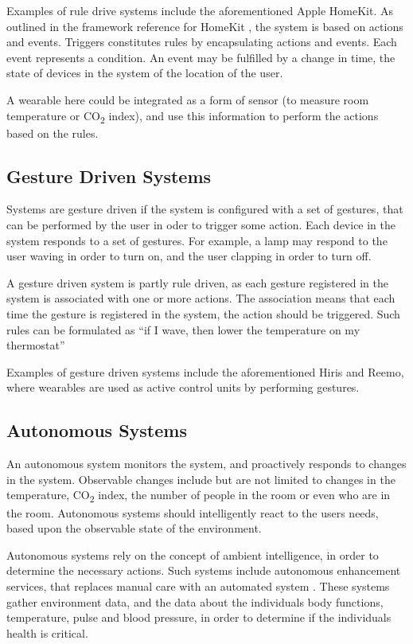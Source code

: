 Examples of rule drive systems include the aforementioned Apple HomeKit. 
As outlined in the framework reference for HomeKit \cite{applehomekitref}, 
the system is based on actions and events. 
Triggers constitutes rules by encapsulating actions and events. 
Each event represents a condition. 
An event may be fulfilled by a change in time, 
the state of devices in the system of the location of the user.

A wearable here could be integrated as a form of sensor (to \eg measure room temperature or CO\textsubscript{2} index), 
and use this information to perform the actions based on the rules.  

\subsection{Gesture Driven Systems}

Systems are gesture driven if the system is configured with a set of gestures, 
that can be performed by the user in oder to trigger some action. 
Each device in the system responds to a set of gestures. 
For example, a lamp may respond to the user waving in order to turn on, 
and the user clapping in order to turn off.

A gesture driven system is partly rule driven, 
as each gesture registered in the system is associated with one or more actions. 
The association means that each time the gesture is registered in the system, the action should be triggered. 
Such rules can be formulated as ``if I wave, then lower the temperature on my thermostat''

Examples of gesture driven systems include the aforementioned Hiris and Reemo, 
where wearables are used as active control units by performing gestures. 

\subsection{Autonomous Systems}

An autonomous system monitors the system, 
and proactively responds to changes in the system. 
Observable changes include but are not limited to changes in the temperature, 
CO\textsubscript{2} index, the number of people in the room or even who are in the room.
Autonomous systems should intelligently react to the users needs, 
based upon the observable state of the environment.

Autonomous systems rely on the concept of ambient intelligence, 
in order to determine the necessary actions.
Such systems include autonomous enhancement services, 
that replaces manual care with an automated system \cite{nehmer2006living}. 
These systems gather environment data, 
and the data about the individuals body functions, 
\eg temperature, pulse and blood pressure, 
in order to determine if the individuals health is critical.


